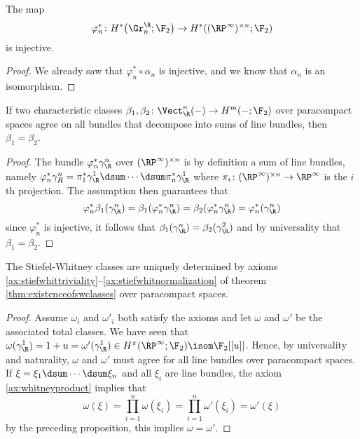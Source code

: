 \begin{corollary}
	The map 
	\begin{equation*}
		\varphi^*_n\colon H^*\big(\Gr^\R_n; \F_2\big) \to H^*((\RP^\infty)^{\times n}; \F_2)
	\end{equation*}
	is injective.
\end{corollary}
\begin{proof}
	We already saw that $\varphi^*_n \circ \alpha_n$ is injective, and we know that $\alpha_n$ is an isomorphism.
\end{proof}
\begin{proposition}
	If two characteristic classes $\beta_1, \beta_2\colon \Vect_\R^n({{-}}) \to H^m({{-}}; \F_2)$ over paracompact spaces agree on all bundles that decompose into sums of line bundles, then $\beta_1 = \beta_2$.
\end{proposition}
\begin{proof}
	The bundle $\varphi^*_n \gamma_\R^n$ over $(\RP^\infty)^{\times n}$ is by definition a sum of line bundles, namely $\varphi_n^* \gamma_R^n = \pi_1^* \gamma_\R^1 \dsum \cdots \dsum \pi_n^* \gamma_\R^1$ where $\pi_i\colon (\RP^\infty)^{\times n} \to \RP^\infty$ is the $i$th projection.
	The assumption then guarantees that
	\begin{equation*}
		\varphi_n^* \beta_1(\gamma_\R^n) = \beta_1(\varphi_n^* \gamma_\R^n) = \beta_2(\varphi_n^* \gamma_\R^n) = \varphi_n^*(\gamma_\R^n)
	\end{equation*}
	since $\varphi_n^*$ is injective, it follows that $\beta_1(\gamma_\R^n) = \beta_2(\gamma_\R^2)$ and by universality that $\beta_1 = \beta_2$.
\end{proof}
\begin{corollary}
	The Stiefel-Whitney classes are uniquely determined by axioms \ref{ax:stiefwhittriviality}--\ref{ax:stiefwhitnormalization} of theorem \ref{thm:existenceofswclasses} over paracompact spaces.
\end{corollary}
\begin{proof}
	Assume $\omega_i$ and $\omega'_i$ both satisfy the axioms and let $\omega$ and $\omega'$ be the associated total classes.
	We have seen that $\omega(\gamma_\R^1) = 1 + u = \omega'(\gamma_\R^1) \in H^\pi(\RP^\infty; \F_2) \isom \F_2[[u]]$.
	Hence, by universality and naturality, $\omega$ and $\omega'$ must agree for all line bundles over paracompact spaces.
	If $\xi = \xi_1 \dsum \cdots \dsum \xi_n$ and all $\xi_i$ are line bundles, the axiom \ref{ax:whitneyproduct} implies that
	\begin{equation*}
		\omega(\xi) = \prod_{i = 1}^n \omega(\xi_i) = \prod_{i = 1}^n \omega'(\xi_i) = \omega'(\xi)
	\end{equation*}
	by the preceding proposition, this implies $\omega = \omega'$.
\end{proof}

